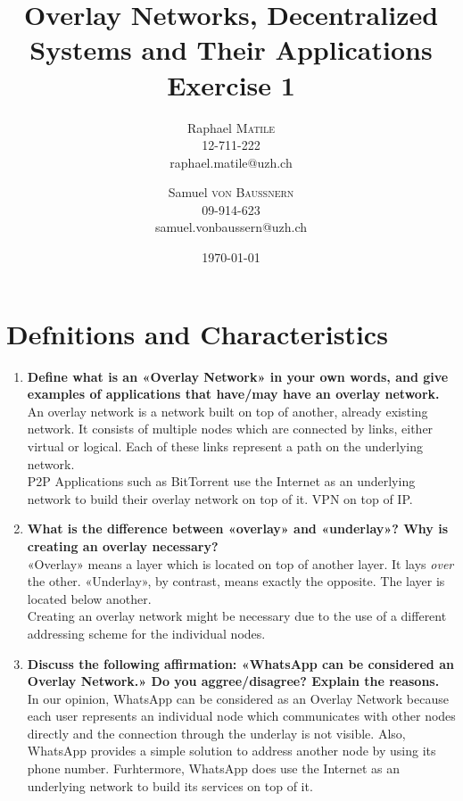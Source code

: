 \documentclass{article}
\title{Overlay Networks, Decentralized Systems and Their Applications\\Exercise 1} %
\author{Raphael \textsc{Matile}\\12-711-222\\raphael.matile@uzh.ch \and Samuel \textsc{von Baussnern}\\09-914-623\\samuel.vonbaussern@uzh.ch}
\date{\today} %
\begin{document}
\maketitle %

\section{Defnitions and Characteristics}
  \begin{enumerate}[1]
    \item \textbf{Define what is an «Overlay Network» in your own words, and give examples of applications that have/may have an overlay network.} \\
            An overlay network is a network built on top of another,
            already existing network. It consists of multiple nodes which
            are connected by links, either virtual or logical.
            Each of these links represent a path on the underlying network. \\
            P2P Applications such as BitTorrent use the Internet as an underlying network to build their overlay network on top of it. VPN on top of IP.
    \item \textbf{What is the difference between «overlay» and «underlay»? Why is creating an overlay necessary?} \\
            «Overlay» means a layer which is located on top of another layer.
            It lays \textit{over} the other. «Underlay», by contrast, means exactly the opposite.
            The layer is located below another. \\
            Creating an overlay network might be necessary due to the use of a different addressing scheme for the individual nodes.
    \item \textbf{Discuss the following affirmation: «WhatsApp can be considered an Overlay Network.» Do you aggree/disagree? Explain the reasons.} \\
            In our opinion, WhatsApp can be considered as an Overlay Network because each user represents an individual node which
            communicates with other nodes directly and the connection through the underlay is not visible. Also, WhatsApp provides a simple solution to address another node by using its phone number.
            Furhtermore, WhatsApp does use the Internet as an underlying network to build its services on top of it.
  \end{enumerate}
\end{document}
